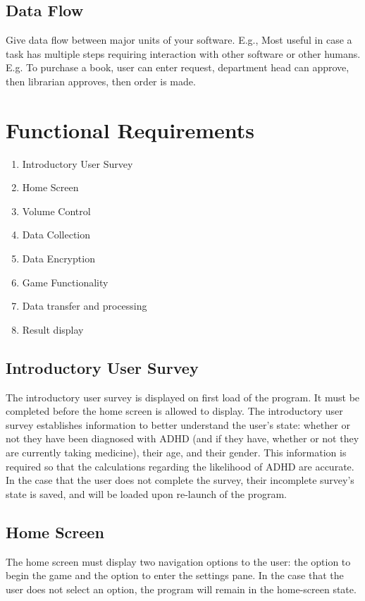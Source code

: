 \documentclass[a4wide]{article}
\begin{document}
\subsection{Data Flow}

Give data flow between major units of your software.
E.g.,
Most useful in case a task has multiple steps requiring interaction
with other software or other humans.
E.g. To purchase a book, user can enter request, department head can
approve, then librarian approves, then order is made.

\section{Functional Requirements}

\begin{enumerate}
\item Introductory User Survey
\item Home Screen
\item Volume Control
\item Data Collection
\item Data Encryption
\item Game Functionality
\item Data transfer and processing
\item Result display
\end{enumerate}


\subsection{Introductory User Survey}
The introductory user survey is displayed on first load of the program. It must
be completed before the home screen is allowed to display. The introductory user
survey establishes information to better understand the user's state: whether or
not they have been diagnosed with ADHD (and if they have, whether or not they
are currently taking medicine), their age, and their gender. This information is
required so that the calculations regarding the likelihood of ADHD are accurate.
In the case that the user does not complete the survey, their incomplete
survey's state is saved, and will be loaded upon re-launch of the program.

\subsection{Home Screen}
The home screen must display two navigation options to the user: the option to
begin the game and the option to enter the settings pane. In the case that the
user does not select an option, the program will remain in the home-screen
state.
\end{document}
